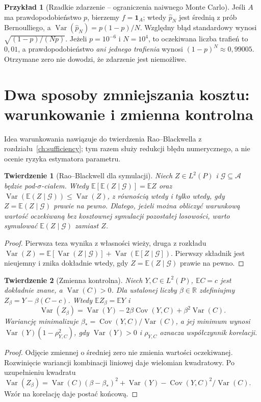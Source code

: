 \documentclass[11pt,a4paper,oneside]{report}
\numberwithin{equation}{chapter}
\theoremstyle{plain}
\newtheorem{twierdzenie}{Twierdzenie}[chapter]
\theoremstyle{definition}
\newtheorem{przyklad}{Przykład}[chapter]
\theoremstyle{remark}
\newcommand{\R}{\mathbb R}
\newcommand{\E}{\mathbb E}
\newcommand{\Var}{\operatorname{Var}}
\newcommand{\Cov}{\operatorname{Cov}}
\newcommand{\ind}[1]{\mathbf 1_{#1}}
\begin{document}
\begin{przyklad}[Rzadkie zdarzenie -- ograniczenia naiwnego Monte Carlo]
\label{ex:mc-rare}
Jeśli $A$ ma prawdopodobieństwo $p$, bierzemy
$f=\ind{A}$; wtedy $\widehat p_N$ jest średnią z prób Bernoulliego,
a $\Var(\widehat p_N)=p(1-p)/N$. Względny błąd standardowy wynosi
$\sqrt{(1-p)/(Np)}$. Jeżeli $p=10^{-6}$ i $N=10^4$,
to oczekiwana liczba trafień to $0{,}01$, a prawdopodobieństwo
\emph{ani jednego trafienia} wynosi $(1-p)^N\approx0{,}99005$.
Otrzymane zero nie dowodzi, że zdarzenie jest niemożliwe.
\end{przyklad}

\section{Dwa sposoby zmniejszania kosztu: warunkowanie i zmienna kontrolna}
Idea warunkowania nawiązuje do twierdzenia Rao--Blackwella z rozdziału~\ref{ch:sufficiency}; tym razem służy redukcji błędu numerycznego, a nie ocenie ryzyka estymatora parametru.
\begin{twierdzenie}[Rao--Blackwell dla symulacji]
\label{thm:mc-rao-blackwell}
Niech $Z\in L^2(P)$ i $\mathcal G\subseteq\mathcal A$ będzie
pod-$\sigma$-ciałem. Wtedy
$\E[\E(Z\mid\mathcal G)]=\E Z$ oraz
$\Var(\E(Z\mid\mathcal G))\le\Var(Z)$,
z równością wtedy i tylko wtedy, gdy
$Z=\E(Z\mid\mathcal G)$ prawie na pewno.
Dlatego, jeżeli można obliczyć warunkową wartość oczekiwaną
bez kosztownej symulacji pozostałej losowości, warto symulować
$\E(Z\mid\mathcal G)$ zamiast $Z$.
\end{twierdzenie}
\begin{proof}
Pierwsza teza wynika z własności wieży, druga z rozkładu
$\Var(Z)=\E[\Var(Z\mid\mathcal G)]
 +\Var(\E[Z\mid\mathcal G])$.
Pierwszy składnik jest nieujemny i znika dokładnie wtedy,
gdy $Z=\E(Z\mid\mathcal G)$ prawie na pewno.
\end{proof}

\begin{twierdzenie}[Zmienna kontrolna]
\label{thm:control-variate}
Niech $Y,C\in L^2(P)$, $\E C=c$ jest dokładnie znane,
a $\Var(C)>0$. Dla ustalonej liczby $\beta\in\R$
zdefiniujmy $Z_\beta=Y-\beta(C-c)$.
Wtedy $\E Z_\beta=\E Y$ i
\[
 \Var(Z_\beta)=\Var(Y)-2\beta\Cov(Y,C)
                      +\beta^2\Var(C).
\]
Wariancję minimalizuje
$\beta_*=\Cov(Y,C)/\Var(C)$, a jej minimum wynosi
$\Var(Y)(1-\rho_{Y,C}^2)$, gdy $\Var(Y)>0$ i
$\rho_{Y,C}$ oznacza współczynnik korelacji.
\end{twierdzenie}
\begin{proof}
Odjęcie zmiennej o średniej zero nie zmienia wartości oczekiwanej.
Rozwinięcie wariancji kombinacji liniowej daje wielomian kwadratowy.
Po uzupełnieniu kwadratu
$\Var(Z_\beta)=\Var(C)(\beta-\beta_*)^2+
\Var(Y)-\Cov(Y,C)^2/\Var(C)$.
Wzór na korelację daje postać końcową.
\end{proof}
\end{document}
